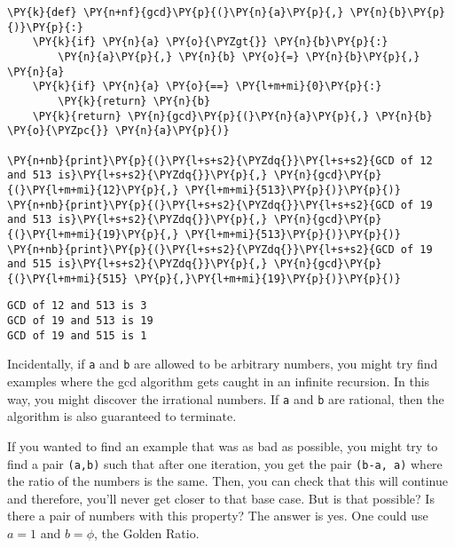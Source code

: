 \begin{Verbatim}[commandchars=\\\{\}]
\PY{k}{def} \PY{n+nf}{gcd}\PY{p}{(}\PY{n}{a}\PY{p}{,} \PY{n}{b}\PY{p}{)}\PY{p}{:}
    \PY{k}{if} \PY{n}{a} \PY{o}{\PYZgt{}} \PY{n}{b}\PY{p}{:}
        \PY{n}{a}\PY{p}{,} \PY{n}{b} \PY{o}{=} \PY{n}{b}\PY{p}{,} \PY{n}{a}
    \PY{k}{if} \PY{n}{a} \PY{o}{==} \PY{l+m+mi}{0}\PY{p}{:}
        \PY{k}{return} \PY{n}{b}
    \PY{k}{return} \PY{n}{gcd}\PY{p}{(}\PY{n}{a}\PY{p}{,} \PY{n}{b} \PY{o}{\PYZpc{}} \PY{n}{a}\PY{p}{)}

\PY{n+nb}{print}\PY{p}{(}\PY{l+s+s2}{\PYZdq{}}\PY{l+s+s2}{GCD of 12 and 513 is}\PY{l+s+s2}{\PYZdq{}}\PY{p}{,} \PY{n}{gcd}\PY{p}{(}\PY{l+m+mi}{12}\PY{p}{,} \PY{l+m+mi}{513}\PY{p}{)}\PY{p}{)}
\PY{n+nb}{print}\PY{p}{(}\PY{l+s+s2}{\PYZdq{}}\PY{l+s+s2}{GCD of 19 and 513 is}\PY{l+s+s2}{\PYZdq{}}\PY{p}{,} \PY{n}{gcd}\PY{p}{(}\PY{l+m+mi}{19}\PY{p}{,} \PY{l+m+mi}{513}\PY{p}{)}\PY{p}{)}
\PY{n+nb}{print}\PY{p}{(}\PY{l+s+s2}{\PYZdq{}}\PY{l+s+s2}{GCD of 19 and 515 is}\PY{l+s+s2}{\PYZdq{}}\PY{p}{,} \PY{n}{gcd}\PY{p}{(}\PY{l+m+mi}{515} \PY{p}{,}\PY{l+m+mi}{19}\PY{p}{)}\PY{p}{)}
\end{Verbatim}

\begin{Verbatim}
GCD of 12 and 513 is 3
GCD of 19 and 513 is 19
GCD of 19 and 515 is 1
\end{Verbatim}


Incidentally, if \texttt{a} and \texttt{b} are allowed to be arbitrary numbers, you might try find examples where the gcd algorithm gets caught in an infinite recursion.  In this way, you might discover the irrational numbers.  If \texttt{a} and \texttt{b} are rational, then the algorithm is also guaranteed to terminate.


If you wanted to find an example that was as bad as possible, you might try to find a pair \texttt{(a,b)} such that after one iteration, you get the pair \texttt{(b-a, a)} where the ratio of the numbers is the same.  Then, you can check that this will continue and therefore, you'll never get closer to that base case.  But is that possible?  Is there a pair of numbers with this property?  The answer is yes.  One could use $a = 1$ and $b = \phi$, the Golden Ratio.

